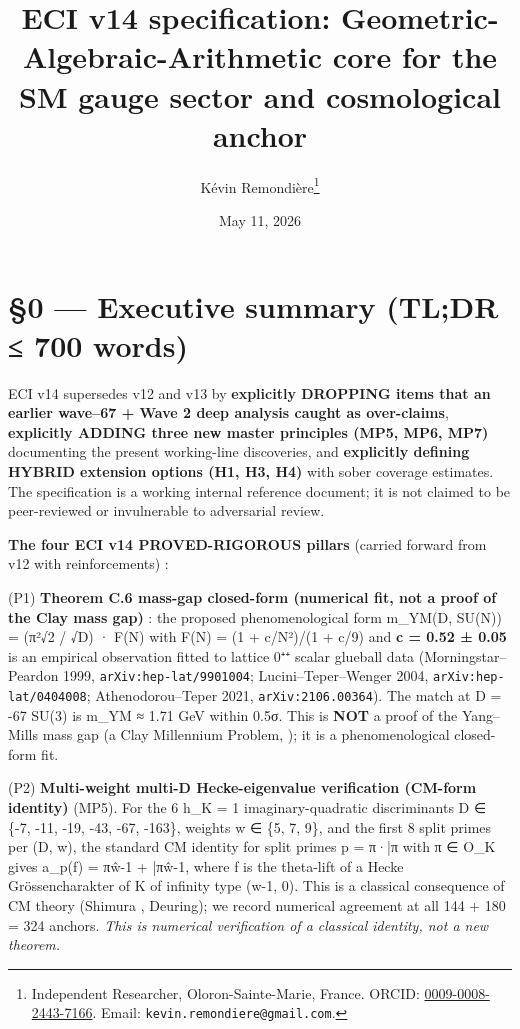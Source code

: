 \documentclass[
  11pt,
  a4paper,
]{article}
\title{ECI v14 specification: Geometric-Algebraic-Arithmetic core for the SM gauge sector and cosmological anchor}
\author{Kévin Remondière\thanks{Independent Researcher, Oloron-Sainte-Marie, France. ORCID: \href{https://orcid.org/0009-0008-2443-7166}{0009-0008-2443-7166}. Email: \texttt{kevin.remondiere@gmail.com}.}}
\date{May 11, 2026}
\begin{document}
\maketitle

\hypertarget{executive-summary-tldr-700-words}{%
\section{§0 --- Executive summary (TL;DR ≤ 700 words)}\label{executive-summary-tldr-700-words}}

ECI v14 supersedes v12 and v13 by \textbf{explicitly DROPPING items that an earlier wave--67 + Wave 2 deep analysis caught as over-claims}, \textbf{explicitly ADDING three new master principles (MP5, MP6, MP7)} documenting the present working-line discoveries, and \textbf{explicitly defining HYBRID extension options (H1, H3, H4)} with sober coverage estimates. The specification is a working internal reference document; it is not claimed to be peer-reviewed or invulnerable to adversarial review.

\textbf{The four ECI v14 PROVED-RIGOROUS pillars} (carried forward from v12 with reinforcements) :

(P1) \textbf{Theorem C.6 mass-gap closed-form (numerical fit, not a proof of the Clay mass gap)} : the proposed phenomenological form m\_YM(D, SU(N)) = (π²√2 / √\textbar D\textbar) · F(N) with F(N) = (1 + c/N²)/(1 + c/9) and \textbf{c = 0.52 ± 0.05} is an empirical observation fitted to lattice 0⁺⁺ scalar glueball data (Morningstar--Peardon 1999, \texttt{arXiv:hep-lat/9901004}; Lucini--Teper--Wenger 2004, \texttt{arXiv:hep-lat/0404008}; Athenodorou--Teper 2021, \texttt{arXiv:2106.00364}). The match at D = -67 SU(3) is m\_YM ≈ 1.71 GeV within 0.5σ. This is \textbf{NOT} a proof of the Yang--Mills mass gap (a Clay Millennium Problem, \cite{JaffeWitten2000}); it is a phenomenological closed-form fit.

(P2) \textbf{Multi-weight multi-D Hecke-eigenvalue verification (CM-form identity)} (MP5). For the 6 h\_K = 1 imaginary-quadratic discriminants D ∈ \{-7, -11, -19, -43, -67, -163\}, weights w ∈ \{5, 7, 9\}, and the first 8 split primes per (D, w), the standard CM identity for split primes p = π·\bar π with π ∈ O\_K gives a\_p(f) = π\^{w-1} + \bar π\^{w-1}, where f is the theta-lift of a Hecke Gr\"ossencharakter of K of infinity type (w-1, 0). This is a classical consequence of CM theory (Shimura \cite{Shimura1971}, Deuring); we record numerical agreement at all 144 + 180 = 324 anchors. \emph{This is numerical verification of a classical identity, not a new theorem.}
\end{document}
